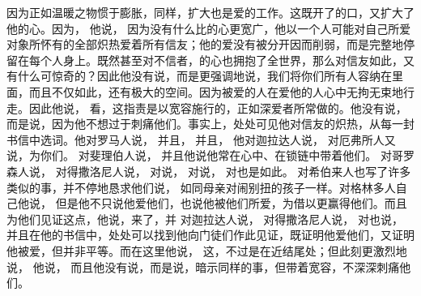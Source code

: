  因为正如温暖之物惯于膨胀，同样，扩大也是爱的工作。这既开了的口，又扩大了他的心。因为， 他说， 因为没有什么比的心更宽广，他以一个人可能对自己所爱对象所怀有的全部炽热爱着所有信友；他的爱没有被分开因而削弱，而是完整地停留在每个人身上。既然甚至对不信者，的心也拥抱了全世界，那么对信友如此，又有什么可惊奇的？因此他没有说，而是更强调地说，我们将你们所有人容纳在里面，而且不仅如此，还有极大的空间。因为被爱的人在爱他的人心中无拘无束地行走。因此他说， 看，这指责是以宽容施行的，正如深爱者所常做的。他没有说，而是说，因为他不想过于刺痛他们。事实上，处处可见他对信友的炽热，从每一封书信中选词。他对罗马人说， 并且， 并且，  他对迦拉达人说，  对厄弗所人又说，为你们。 对斐理伯人说， 并且他说他常在心中、在锁链中带着他们。 对哥罗森人说，  对得撒洛尼人说，  对说，  对说，  对也是如此。 对希伯来人也写了许多类似的事，并不停地恳求他们说，  如同母亲对闹别扭的孩子一样。对格林多人自己他说， 但是他不只说他爱他们，也说他被他们所爱，为借以更赢得他们。而且为他们见证这点，他说，来了，并  对迦拉达人说，  对得撒洛尼人说，  对也说，  并且在他的书信中，处处可以找到他向门徒们作此见证，既证明他爱他们，又证明他被爱，但并非平等。而在这里他说，  这，不过是在近结尾处；但此刻更激烈地说，  他说， 而且他没有说，而是说，暗示同样的事，但带着宽容，不深深刺痛他们。\par

